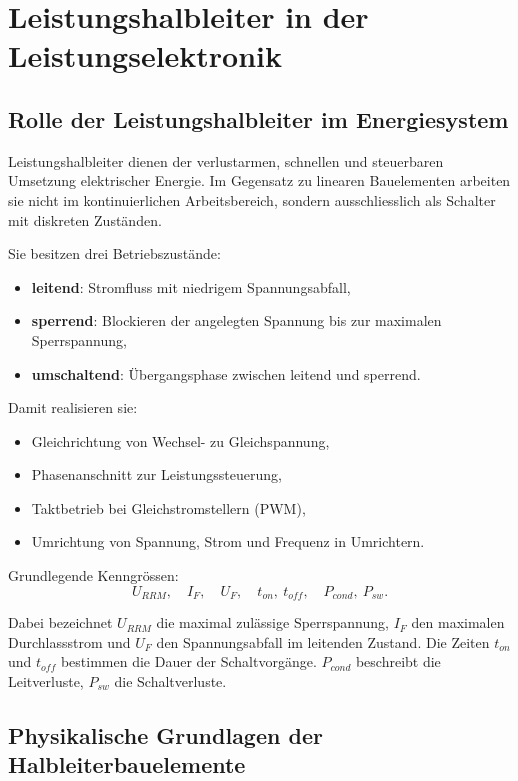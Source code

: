 \section{Leistungshalbleiter in der Leistungselektronik}

\subsection{Rolle der Leistungshalbleiter im Energiesystem}

Leistungshalbleiter dienen der verlustarmen, schnellen und steuerbaren Umsetzung elektrischer Energie.
Im Gegensatz zu linearen Bauelementen arbeiten sie nicht im kontinuierlichen Arbeitsbereich,
sondern ausschliesslich als Schalter mit diskreten Zuständen.

Sie besitzen drei Betriebszustände:
\begin{itemize}
\item \textbf{leitend}: Stromfluss mit niedrigem Spannungsabfall,
\item \textbf{sperrend}: Blockieren der angelegten Spannung bis zur maximalen Sperrspannung,
\item \textbf{umschaltend}: Übergangsphase zwischen leitend und sperrend.
\end{itemize}

Damit realisieren sie:
\begin{itemize}
\item Gleichrichtung von Wechsel- zu Gleichspannung,
\item Phasenanschnitt zur Leistungssteuerung,
\item Taktbetrieb bei Gleichstromstellern (PWM),
\item Umrichtung von Spannung, Strom und Frequenz in Umrichtern.
\end{itemize}

Grundlegende Kenngrössen:
\[
U_{RRM},\quad I_{F},\quad U_F,\quad t_{on},\ t_{off},\quad P_{cond},\ P_{sw}.
\]

Dabei bezeichnet $U_{RRM}$ die maximal zulässige Sperrspannung, $I_F$ den maximalen Durchlassstrom
und $U_F$ den Spannungsabfall im leitenden Zustand.
Die Zeiten $t_{on}$ und $t_{off}$ bestimmen die Dauer der Schaltvorgänge.
$P_{cond}$ beschreibt die Leitverluste, $P_{sw}$ die Schaltverluste.

\subsection{Physikalische Grundlagen der Halbleiterbauelemente}

